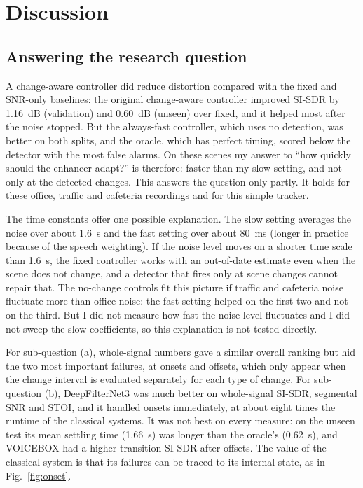 \documentclass[10pt,conference,a4paper]{IEEEtran}
\begin{document}
\section{Discussion}
\label{sec:discussion}

\subsection{Answering the research question}
A change-aware controller did reduce distortion compared with the fixed and
SNR-only baselines: the original change-aware controller improved SI-SDR by
1.16~dB (validation) and 0.60~dB (unseen) over fixed, and it helped most after
the noise stopped. But the always-fast controller, which uses no detection, was
better on both splits, and the oracle, which has perfect timing, scored below
the detector with the most false alarms. On these scenes my answer to ``how
quickly should the enhancer adapt?'' is therefore: faster than my slow setting,
and not only at the detected changes. This answers the question only partly. It
holds for these office, traffic and cafeteria recordings and for this simple
tracker.

The time constants offer one possible explanation. The slow setting averages the
noise over about 1.6~s and the fast setting over about 80~ms (longer in
practice because of the speech weighting). If the noise level moves on a shorter
time scale than 1.6~s, the fixed controller works with an out-of-date estimate
even when the scene does not change, and a detector that fires only at scene
changes cannot repair that. The no-change controls fit this picture if traffic and
cafeteria noise fluctuate more than office noise: the fast setting helped on the
first two and not on the third. But I did not measure how fast the noise level
fluctuates and I did not sweep the slow coefficients, so this explanation is not
tested directly.

For sub-question (a), whole-signal numbers gave a similar overall ranking but
hid the two most important failures, at onsets and offsets, which only appear
when the change interval is evaluated separately for each type of change. For
sub-question (b), DeepFilterNet3 was much better on whole-signal SI-SDR,
segmental SNR and STOI, and it handled onsets immediately, at about eight times
the runtime of the classical systems. It was not best on every measure: on the
unseen test its mean settling time (1.66~s) was longer than the oracle's
(0.62~s), and VOICEBOX had a higher transition SI-SDR after offsets. The value of
the classical system is that its failures can be traced to its internal state,
as in Fig.~\ref{fig:onset}.
\end{document}
